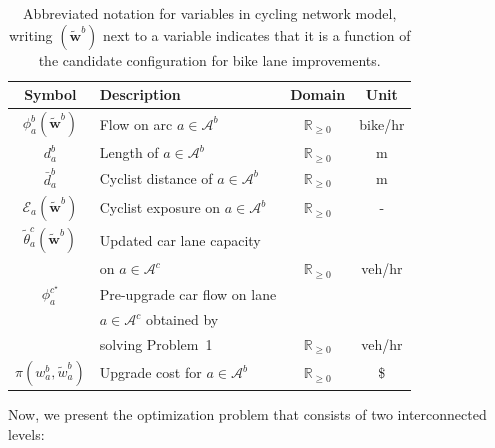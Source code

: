 \documentclass[letterpaper, 10 pt, conference]{ieeeconf}  %
\begin{document}
\begin{table}[h!]
\centering
\vspace{0.2cm}
\begin{tabular}{c|l|c|c}
\hline
\textbf{Symbol} & \textbf{Description} & \textbf{Domain} & \textbf{Unit} \\ \hline
$\phi^{b}_{a}(\tilde{\mathbf{w}}^{b})$ & Flow on arc $a \in \mathcal{A}^{b}$ & $\mathbb{R}_{\geq 0}$ & bike/hr\\
$d_{a}^{b}$ & Length of $a \in \mathcal{A}^{b}$ & $\mathbb{R}_{\geq 0}$ & m \\ 
$\bar{d}_{a}^{b}$ & Cyclist distance of $a \in \mathcal{A}^{b}$ & $\mathbb{R}_{\geq 0}$ & m \\ 
$\mathcal{E}_{a}(\tilde{\mathbf{w}}^{b})$ & Cyclist exposure on  $a \in \mathcal{A}^{b}$ & $\mathbb{R}_{\geq 0}$ & -\\
$\tilde{\theta}^{c}_{a}(\tilde{\mathbf{w}}^{b})$ & Updated car lane capacity &  &  \\
 & on $a \in \mathcal{A}^{c}$ & $\mathbb{R}_{\geq 0}$ & veh/hr \\
$\phi^{c^{\star}}_{a}$ & Pre-upgrade car flow on lane &  &  \\
 & $a \in \mathcal{A}^{c}$  obtained by & & \\
 & solving Problem~1 & $\mathbb{R}_{\geq 0}$ & veh/hr \\
$\pi(w_{a}^{b},\tilde{w}_{a}^{b})$ & Upgrade cost for $a \in \mathcal{A}^{b}$ & $\mathbb{R}_{\geq 0}$ & \$ \\ 
\hline
\end{tabular}
\caption{\footnotesize Abbreviated notation for variables in cycling network model, writing $(\tilde{\mathbf{w}}^{b})$ next to a variable indicates that it is a function of the candidate configuration for bike lane improvements.}
\label{table:notation_summary}
\end{table}
 Now, we present the optimization problem that consists of two interconnected levels:
\end{document}
